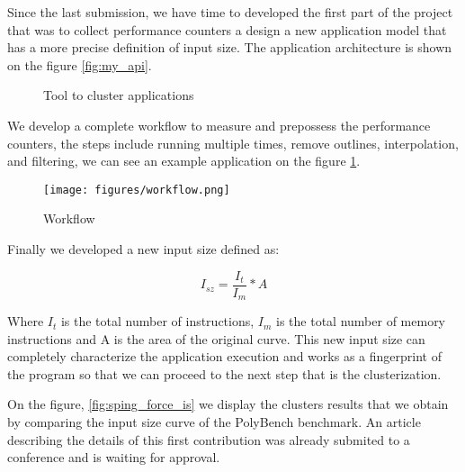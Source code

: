 Since the last submission, we have time to developed the first part of the project that was to collect performance counters a design a new application model that has a more precise definition of input size. The application architecture is shown on the figure \ref{fig:my_api}.


\begin{figure}
    \qquad
    \caption{Tool to cluster applications}
\end{figure}

We develop a complete workflow to measure and prepossess the performance counters, the steps include running multiple times, remove outlines, interpolation, and filtering, we can see an example application on the figure \ref{fig:workflow}.

\begin{figure}[h]
    \centering
    \texttt{[image: figures/workflow.png]}
    \caption{Workflow}
    \label{fig:workflow}
\end{figure}

Finally we developed a new input size defined as:

\begin{equation}
I_{sz}=\frac{I_t}{I_m}*A
\end{equation}

Where $I_{t}$ is the total number of instructions, $I_m$ is the total number of memory instructions and A is the area of the original curve. This new input size can completely characterize the application execution and works as a fingerprint of the program so that we can proceed to the next step that is the clusterization.

On the figure, \ref{fig:sping_force_is} we display the clusters results that we obtain by comparing the input size curve of the PolyBench benchmark. An article describing the details of this first contribution was already submited to a conference and is waiting for approval.

